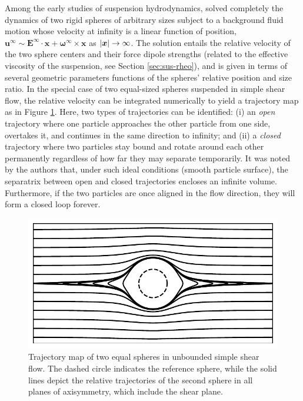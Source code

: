 Among the early studies of suspension hydrodynamics, \cite{batchelor_green_1972} solved completely the dynamics of two rigid spheres of arbitrary sizes subject to a background fluid motion whose velocity at infinity is a linear function of position, \ie
${\bm u}^\infty \sim {\bm E}^\infty \cdot {\bm x} + {\bm \omega}^\infty \times {\bm x}$ as $\lvert{\bm x}\rvert \to \infty$.
The solution entails the relative velocity of the two sphere centers and their force dipole strengths (related to the effective viscosity of the suspension, see Section \ref{sec:sus-rheo}), and is given in terms of several geometric parameters functions of the spheres' relative position and size ratio.
In the special case of two equal-sized spheres suspended in simple shear flow, the relative velocity can be integrated numerically to yield a trajectory map as in Figure \ref{fig:BG-traj}.
Here, two types of trajectories can be identified:
(i) an \emph{open} trajectory where one particle approaches the other particle from one side, overtakes it, and continues in the same direction to infinity; and
(ii) a \emph{closed} trajectory where two particles stay bound and rotate around each other permanently regardless of how far they may separate temporarily.
It was noted by the authors that, under such ideal conditions (\eg smooth particle surface), the separatrix between open and closed trajectories encloses an infinite volume.
Furthermore, if the two particles are once aligned in the flow direction, they will form a closed loop forever.

\begin{figure}%
  \centering
  \includegraphics[width=0.8\columnwidth]{BG-traj4.pdf}
  \caption{Trajectory map of two equal spheres in unbounded simple shear flow. The dashed circle indicates the reference sphere, while the solid lines depict the relative trajectories of the second sphere in all planes of axisymmetry, which include the shear plane.}
  \label{fig:BG-traj}
\end{figure}

